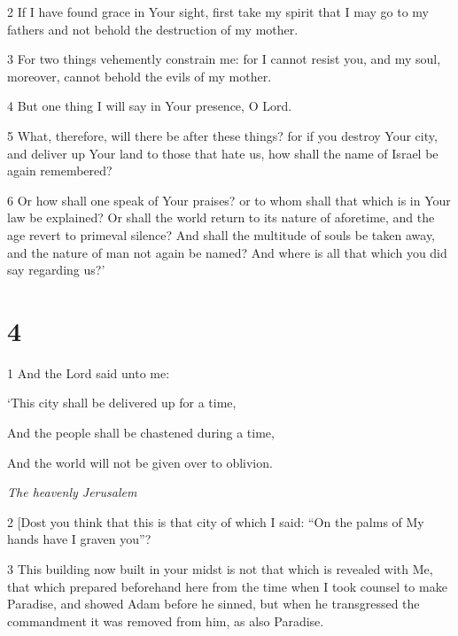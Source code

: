 \par 2 If I have found grace in Your sight, first take my spirit that I may go to my fathers and not behold the destruction of my mother. 

\par 3 For two things vehemently constrain me: for I cannot resist you, and my soul, moreover, cannot behold the evils of my mother. 

\par 4 But one thing I will say in Your presence, O Lord. 

\par 5 What, therefore, will there be after these things? for if you destroy Your city, and deliver up Your land to those that hate us, how shall the name of Israel be again remembered? 

\par 6 Or how shall one speak of Your praises? or to whom shall that which is in Your law be explained? Or shall the world return to its nature of aforetime, and the age revert to primeval silence? And shall the multitude of souls be taken away, and the nature of man not again be named? And where is all that which you did say regarding us?’

\chapter{4}

\par 1 And the Lord said unto me:

\par ‘This city shall be delivered up for a time,

\par And the people shall be chastened during a time,

\par And the world will not be given over to oblivion.

\par \textit{The heavenly Jerusalem}

\par 2 [Dost you think that this is that city of which I said: “On the palms of My hands have I graven you”? 

\par 3 This building now built in your midst is not that which is revealed with Me, that which prepared beforehand here from the time when I took counsel to make Paradise, and showed Adam before he sinned, but when he transgressed the commandment it was removed from him, as also Paradise. 

